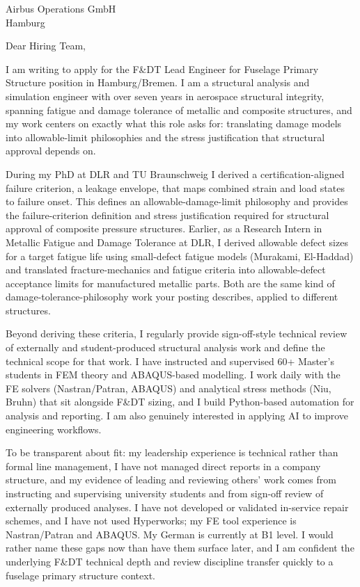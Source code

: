 \documentclass[10pt]{letter}
\begin{document}
\begin{letter}{Airbus Operations GmbH \\ Hamburg}
\opening{Dear Hiring Team,}

I am writing to apply for the F\&DT Lead Engineer for Fuselage Primary Structure position in Hamburg/Bremen. I am a structural analysis and simulation engineer with over seven years in aerospace structural integrity, spanning fatigue and damage tolerance of metallic and composite structures, and my work centers on exactly what this role asks for: translating damage models into allowable-limit philosophies and the stress justification that structural approval depends on.

During my PhD at DLR and TU Braunschweig I derived a certification-aligned failure criterion, a leakage envelope, that maps combined strain and load states to failure onset. This defines an allowable-damage-limit philosophy and provides the failure-criterion definition and stress justification required for structural approval of composite pressure structures. Earlier, as a Research Intern in Metallic Fatigue and Damage Tolerance at DLR, I derived allowable defect sizes for a target fatigue life using small-defect fatigue models (Murakami, El-Haddad) and translated fracture-mechanics and fatigue criteria into allowable-defect acceptance limits for manufactured metallic parts. Both are the same kind of damage-tolerance-philosophy work your posting describes, applied to different structures.

Beyond deriving these criteria, I regularly provide sign-off-style technical review of externally and student-produced structural analysis work and define the technical scope for that work. I have instructed and supervised 60+ Master's students in FEM theory and ABAQUS-based modelling. I work daily with the FE solvers (Nastran/Patran, ABAQUS) and analytical stress methods (Niu, Bruhn) that sit alongside F\&DT sizing, and I build Python-based automation for analysis and reporting. I am also genuinely interested in applying AI to improve engineering workflows.

To be transparent about fit: my leadership experience is technical rather than formal line management, I have not managed direct reports in a company structure, and my evidence of leading and reviewing others' work comes from instructing and supervising university students and from sign-off review of externally produced analyses. I have not developed or validated in-service repair schemes, and I have not used Hyperworks; my FE tool experience is Nastran/Patran and ABAQUS. My German is currently at B1 level. I would rather name these gaps now than have them surface later, and I am confident the underlying F\&DT technical depth and review discipline transfer quickly to a fuselage primary structure context.


\end{letter}
\end{document}
